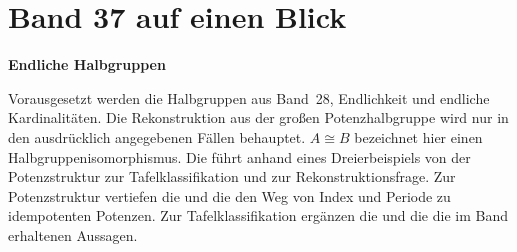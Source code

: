 \chapter[Band 37: Endliche Halbgruppen]{Band 37 auf einen Blick}
\noindent\textbf{Endliche Halbgruppen}\par\medskip
Vorausgesetzt werden die Halbgruppen aus Band~28, Endlichkeit und
endliche Kardinalitäten. Die Rekonstruktion aus der großen Potenzhalbgruppe
wird nur in den ausdrücklich angegebenen Fällen behauptet.
\(A\cong B\) bezeichnet hier einen Halbgruppenisomorphismus.
Die \FiniteSemigroupsReadingLink{} führt anhand eines Dreierbeispiels
von der Potenzstruktur zur Tafelklassifikation und zur Rekonstruktionsfrage.
Zur Potenzstruktur vertiefen die \IndexPeriodReadingLink{} und die
\IndexPeriodProofsLink{} den Weg von Index und Periode zu idempotenten Potenzen.
Zur Tafelklassifikation ergänzen die \TableIsomorphismsReadingLink{}
und die \TableIsomorphismsProofsLink{} die im Band erhaltenen Aussagen.


